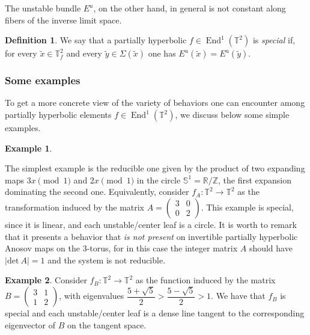 \documentclass[a4paper,11pt,reqno]{amsart}
\def\det{\textrm{det}\ }
\newcommand{\Z}{{\mathbb Z}}
\newcommand{\R}{{\mathbb R}}
\newcommand{\TT}{{\mathbb{T}^2}}
\newcommand{\TTf}{{\mathbb{T}_f^2}}
\newcommand{\tix}{\tilde{x}}
\theoremstyle{definition}
\newtheorem{definition}[theorem]{Definition}
\newtheorem{example}{Example}
\begin{document}
The unstable bundle $E^u$, on the other hand, in general is not constant along fibers of the inverse limit space. 

\begin{definition}
 We say that a partially hyperbolic $f\in\operatorname{End}^1(\TT)$ is \emph{special} if, for every $\tix\in\TTf$ and every $\tilde{y}\in\Sigma(\tix)$ one has $E^u(\tix)=E^u(\tilde{y})$.   
\end{definition}

\subsubsection{Some examples} To get a more concrete view of the variety of behaviors one can encounter among partially hyperbolic elements $f\in\operatorname{End}^1(\TT)$, we discuss below some simple examples.

\begin{example}
    \label{ex:1}
    
    The simplest example is the reducible one given by the product of two expanding maps $3x \pmod{1}$ and $2x \pmod{1}$ in the circle $\mathbb{S}^1 = \R/\Z$, the first expansion dominating the second one. Equivalently, consider $f_A: \mathbb{T}^2 \to \mathbb{T}^2$ as the transformation induced by the matrix $A = \left(\begin{matrix} 
3 & 0\\
0 & 2
\end{matrix}\right)$.
This example is special, since it is linear, and each unstable/center leaf is a circle. It is worth to remark that it presents a behavior that \emph{is not present} on invertible partially hyperbolic Anosov maps on the 3-torus, for in this case the integer matrix $A$ should have $\vert \det A \vert = 1$ and the system is not reducible.
\end{example}

\begin{example}
    \label{ex:2}
Consider $f_B: \mathbb{T}^2 \to \mathbb{T}^2$ as the function induced by the matrix $B = \left(\begin{matrix} 
3 & 1\\
1 & 2
\end{matrix}\right)$, with eigenvalues $\dfrac{5+ \sqrt{5}}{2} > \dfrac{5- \sqrt{5}}{2} > 1$. We have that $f_B$ is special and each unstable/center leaf is a dense line tangent to the corresponding eigenvector of $B$ on the tangent space.
\end{example}
\end{document}
